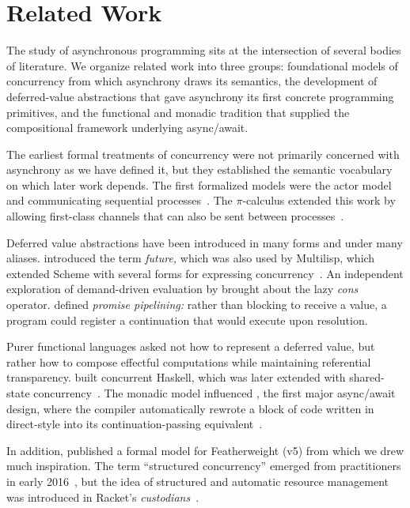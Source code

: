 \section{Related Work}\label{sec:relatedwork}

The study of asynchronous programming sits at the intersection of several bodies of literature. We organize related work into three groups: foundational models of concurrency from which asynchrony draws its semantics, the development of deferred-value abstractions that gave asynchrony its first concrete programming primitives, and the functional and monadic tradition that supplied the compositional framework underlying async/await.

The earliest formal treatments of concurrency were not primarily concerned with asynchrony as we have defined it, but they established the semantic vocabulary on which later work depends. The first formalized models were the actor model~\cite{baker_incremental_1977,agha_actors_1986} and communicating sequential processes~\cite{hoare_communicating_1978}. The $\pi$-calculus extended this work by allowing first-class channels that can also be sent between processes~\cite{milner_calculus_1992}.

Deferred value abstractions have been introduced in many forms and under many aliases. \citet{baker_incremental_1977} introduced the term \textit{future,} which was also used by Multilisp, which extended Scheme with several forms for expressing concurrency~\cite{halstead_multilisp_1985}. An independent exploration of demand-driven evaluation by \citet{friedman1976cons} brought about the lazy \textit{cons} operator. \citet{miller_concurrency_2005} defined \textit{promise pipelining:} rather than blocking to receive a value, a program could register a continuation that would execute upon resolution.

Purer functional languages asked not how to represent a deferred value, but rather how to compose effectful computations while maintaining referential transparency. \citet{jones_concurrent_1996} built concurrent Haskell, which was later extended with shared-state concurrency~\cite{harris_composable_nodate}. The monadic model influenced \FSharp, the first major async/await design, where the compiler automatically rewrote a block of code written in direct-style into its continuation-passing equivalent~\cite{syme2011async}.

In addition, \citet{bierman_pause_2012} published a formal model for Featherweight \CSharp (v5) from which we drew much inspiration. The term ``structured concurrency'' emerged from practitioners in early 2016~\cite{sustrik_getting_2016-1,sustrik_getting_2016,sustrik_structured_2025}, but the idea of structured and automatic resource management was introduced in Racket's \emph{custodians}~\cite{flatt:1999custodians}.

